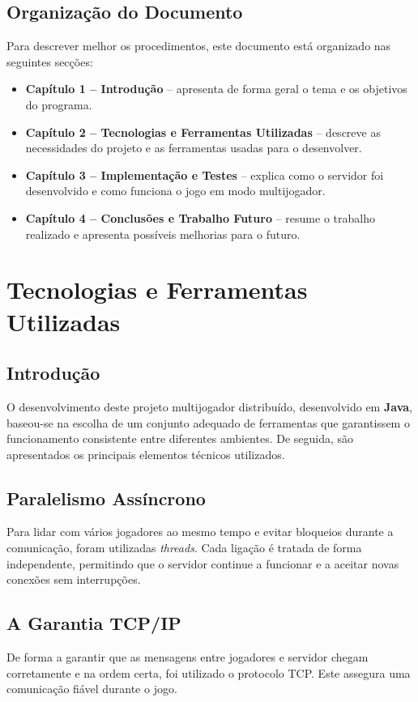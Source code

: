 \documentclass[11pt,a4paper,oneside]{report}
\begin{document}
\section{Organização do Documento}
Para descrever melhor os procedimentos, este documento está organizado nas seguintes secções:
\begin{itemize}
    \item \textbf{Capítulo 1 -- Introdução} -- apresenta de forma geral o tema e os objetivos do programa.
    \item \textbf{Capítulo 2 -- Tecnologias e Ferramentas Utilizadas} -- descreve as necessidades do projeto e as ferramentas usadas para o desenvolver.
    \item \textbf{Capítulo 3 -- Implementação e Testes} -- explica como o servidor foi desenvolvido e como funciona o jogo em modo multijogador.
    \item \textbf{Capítulo 4 -- Conclusões e Trabalho Futuro} -- resume o trabalho realizado e apresenta possíveis melhorias para o futuro.
\end{itemize}


\chapter{Tecnologias e Ferramentas Utilizadas}
\section{Introdução}
O desenvolvimento deste projeto multijogador distribuído, desenvolvido em \textbf{Java}, baseou-se na escolha de um conjunto adequado de ferramentas que garantissem o funcionamento consistente entre diferentes ambientes. De seguida, são apresentados os principais elementos técnicos utilizados.


\section{Paralelismo Assíncrono}
Para lidar com vários jogadores ao mesmo tempo e evitar bloqueios durante a comunicação, foram utilizadas \textit{threads}. Cada ligação é tratada de forma independente, permitindo que o servidor continue a funcionar e a aceitar novas conexões sem interrupções.

\section{A Garantia TCP/IP}
De forma a garantir que as mensagens entre jogadores e servidor chegam corretamente e na ordem certa, foi utilizado o protocolo TCP. Este assegura uma comunicação fiável durante o jogo.
\end{document}
